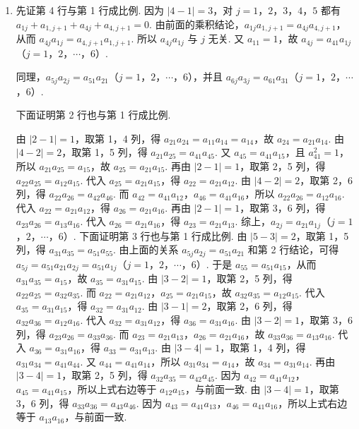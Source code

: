\documentclass[UTF8,a4paper,oneside,11pt]{ctexbook}
\begin{document}
\begin{solution}
\begin{enumerate}
\item 先证第 4 行与第 1 行成比例. 因为 \( \left| 4-1 \right|=3 \)，对 \(j=1\)，\(2\)，\(3\)，\(4\)，\(5\) 都有 \( a_{1j}+a_{1,j+1}+a_{4j}+a_{4,j+1}=0 \). 由前面的乘积结论，\( a_{1j}a_{1,j+1}=a_{4j}a_{4,j+1} \)，从而 \( a_{4j}a_{1j}=a_{4,j+1}a_{1,j+1} \). 所以 \( a_{4j}a_{1j} \) 与 \( j \) 无关. 又 \( a_{11}=1 \)，故 \( a_{4j}=a_{41}a_{1j} \)（\(j=1\)，\(2\)，\(\cdots\)，\(6\)）.

同理，\( a_{5j}a_{2j}=a_{51}a_{21} \)（\(j=1\)，\(2\)，\(\cdots\)，\(6\)），并且 \( a_{6j}a_{3j}=a_{61}a_{31} \)（\(j=1\)，\(2\)，\(\cdots\)，\(6\)）.

下面证明第 2 行也与第 1 行成比例.

由 \( \left| 2-1 \right|=1 \)，取第 1，4 列，得 \( a_{21}a_{24}=a_{11}a_{14}=a_{14} \)，故 \( a_{24}=a_{21}a_{14} \).
由 \( \left| 4-2 \right|=2 \)，取第 1，5 列，得 \( a_{21}a_{25}=a_{41}a_{45} \). 又 \( a_{45}=a_{41}a_{15} \)，且 \( a_{41}^2=1 \)，所以 \( a_{21}a_{25}=a_{15} \)，故 \( a_{25}=a_{21}a_{15} \).
再由 \( \left| 2-1 \right|=1 \)，取第 2，5 列，得 \( a_{22}a_{25}=a_{12}a_{15} \). 代入 \( a_{25}=a_{21}a_{15} \)，得 \( a_{22}=a_{21}a_{12} \).
由 \( \left| 4-2 \right|=2 \)，取第 2，6 列，得 \( a_{22}a_{26}=a_{42}a_{46} \). 而 \( a_{42}=a_{41}a_{12} \)，\( a_{46}=a_{41}a_{16} \)，所以 \( a_{22}a_{26}=a_{12}a_{16} \). 代入 \( a_{22}=a_{21}a_{12} \)，得 \( a_{26}=a_{21}a_{16} \).
再由 \( \left| 2-1 \right|=1 \)，取第 3，6 列，得 \( a_{23}a_{26}=a_{13}a_{16} \). 代入 \( a_{26}=a_{21}a_{16} \)，得 \( a_{23}=a_{21}a_{13} \).
综上，\( a_{2j}=a_{21}a_{1j} \)（\(j=1\)，\(2\)，\(\cdots\)，\(6\)）.
下面证明第 3 行也与第 1 行成比例.
由 \( \left| 5-3 \right|=2 \)，取第 1，5 列，得 \( a_{31}a_{35}=a_{51}a_{55} \). 由上面的关系 \( a_{5j}a_{2j}=a_{51}a_{21} \) 和第 2 行结论，可得 \( a_{5j}=a_{51}a_{21}a_{2j}=a_{51}a_{1j} \)（\(j=1\)，\(2\)，\(\cdots\)，\(6\)）. 于是 \( a_{55}=a_{51}a_{15} \)，从而 \( a_{31}a_{35}=a_{15} \)，故 \( a_{35}=a_{31}a_{15} \).
由 \( \left| 3-2 \right|=1 \)，取第 2，5 列，得 \( a_{22}a_{25}=a_{32}a_{35} \). 而 \( a_{22}=a_{21}a_{12} \)，\( a_{25}=a_{21}a_{15} \)，故 \( a_{32}a_{35}=a_{12}a_{15} \). 代入 \( a_{35}=a_{31}a_{15} \)，得 \( a_{32}=a_{31}a_{12} \).
由 \( \left| 3-1 \right|=2 \)，取第 2，6 列，得 \( a_{32}a_{36}=a_{12}a_{16} \). 代入 \( a_{32}=a_{31}a_{12} \)，得 \( a_{36}=a_{31}a_{16} \).
由 \( \left| 3-2 \right|=1 \)，取第 3，6 列，得 \( a_{23}a_{26}=a_{33}a_{36} \). 而 \( a_{23}=a_{21}a_{13} \)，\( a_{26}=a_{21}a_{16} \)，故 \( a_{33}a_{36}=a_{13}a_{16} \). 代入 \( a_{36}=a_{31}a_{16} \)，得 \( a_{33}=a_{31}a_{13} \).
由 \( \left| 3-4 \right|=1 \)，取第 1，4 列，得 \( a_{31}a_{34}=a_{41}a_{44} \). 又 \( a_{44}=a_{41}a_{14} \)，所以 \( a_{31}a_{34}=a_{14} \)，故 \( a_{34}=a_{31}a_{14} \).
再由 \( \left| 3-4 \right|=1 \)，取第 2，5 列，得 \( a_{32}a_{35}=a_{42}a_{45} \).
因为 \( a_{42}=a_{41}a_{12} \)，\( a_{45}=a_{41}a_{15} \)，所以上式右边等于 \( a_{12}a_{15} \)，与前面一致.
由 \( \left| 3-4 \right|=1 \)，取第 3，6 列，得 \( a_{33}a_{36}=a_{43}a_{46} \).
因为 \( a_{43}=a_{41}a_{13} \)，\( a_{46}=a_{41}a_{16} \)，所以上式右边等于 \( a_{13}a_{16} \)，与前面一致.


\end{enumerate}
\end{solution}
\end{document}
